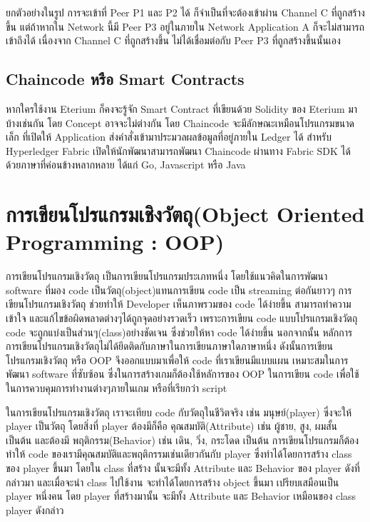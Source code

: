ยกตัวอย่างในรูป การจะเข้าที่ Peer P1 และ P2 ได้ ก็จำเป็นที่จะต้องเข้าผ่าน Channel C ที่ถูกสร้างขึ้น แต่ถ้าหากใน Network นี้มี Peer P3 อยู่ในภายใน Network Application A ก็จะไม่สามารถเข้าถึงได้ เนื่องจาก Channel C ที่ถูกสร้างขึ้น ไม่ได้เชื่อมต่อกับ Peer P3 ที่ถูกสร้างขึ้นนั้นเอง

\subsection{Chaincode หรือ Smart Contracts}
หากใครใช้งาน Eterium ก็คงจะรู้จัก Smart Contract ที่เขียนด้วย Solidity ของ Eterium มาบ้างเช่นกัน โดย Concept อาจจะไม่ต่างกัน โดย Chaincode จะมีลักษณะเหมือนโปรแกรมขนาดเล็ก ที่เปิดให้ Application ส่งคำสั่งเข้ามาประมวลผลข้อมูลที่อยู่ภายใน Ledger ได้ สำหรับ Hyperledger Fabric เปิดให้นักพัฒนาสามารถพัฒนา Chaincode ผ่านทาง Fabric SDK ได้ด้วยภาษาที่ค่อนข้างหลากหลาย ได้แก่ Go, Javascript หรือ Java

\section{การเขียนโปรแกรมเชิงวัตถุ(Object Oriented Programming : OOP)}
\enskip \enskip \enskip \enskip \enskip การเขียนโปรแกรมเชิงวัตถุ เป็นการเขียนโปรแกรมประเภทหนึ่ง โดยใช้แนวคิดในการพัฒนา software 
ที่มอง code เป็นวัตถุ(object)แทนการเขียน code เป็น streaming ต่อกันยาวๆ การเขียนโปรแกรมเชิงวัตถุ
ช่วยทำให้ Developer เห็นภาพรวมของ code ได้ง่ายขึ้น สามารถทำความเข้าใจ และแก้ไขข้อผิดพลาดต่างๆได้ถูกจุดอย่างรวดเร็ว 
เพราะการเขียน code แบบโปรแกรมเชิงวัตถุ code จะถูกแบ่งเป็นส่วนๆ(class)อย่างชัดเจน ซึ่งช่วยให้หา code ได้ง่ายขึ้น  
นอกจากนั้น หลักการการเขียนโปรแกรมเชิงวัตถุไม่ได้ยึดติดกับภาษาในการเขียนภาษาใดภาษาหนึ่ง ดังนั้นการเขียนโปรแกรมเชิงวัตถุ หรือ OOP จึงออกแบบมาเพื่อให้ code
ที่เราเขียนมีแบบแผน เหมาะสมในการพัฒนา software ที่ซับซ้อน ซึ่งในการสร้างเกมก็ต้องใช้หลัการของ OOP ในการเขียน code เพื่อใช้ในการควบคุมการทำงานต่างๆภายในเกม 
หรือที่เรียกว่า script

\enskip \enskip \enskip \enskip \enskip ในการเขียนโปรแกรมเชิงวัตถุ เราจะเทียบ code กับวัตถุในชีวิตจริง เช่น มนุษย์(player) ซึ่งจะให้ player เป็นวัตถุ 
โดยสิ่งที่ player ต้องมีก็คือ คุณสมบัติ(Attribute) เช่น ผู้ชาย, สูง, ผมสั้น เป็นต้น และต้องมี พฤติกรรม(Behavior) เช่น เดิน, วิ่ง, กระโดด เป็นต้น 
การเขียนโปรแกรมก็ต้องทำให้ code ของเรามีคุณสมบัติและพฤติกรรมเช่นเดียวกันกับ player ซึ่งทำได้โดยการสร้าง class ของ player ขึ้นมา โดยใน class ที่สร้าง
นั้นจะมีทั้ง Attribute และ Behavior ของ player ดังที่กล่าวมา และเมื่อจะนำ class ไปใช้งาน จะทำได้โดยการสร้าง object ขึ้นมา เปรียบเสมือนเป็น player หนึ่งคน
โดย player ที่สร้างมานั้น จะมีทั้ง Attribute และ Behavior เหมือนของ class player ดังกล่าว


